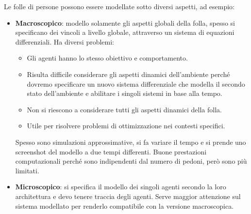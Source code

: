 Le folle di persone possono essere modellate sotto diversi aspetti, ad esempio:
\begin{itemize}
      \item \textbf{Macroscopico}: modello solamente gli aspetti globali della
            folla, spesso si specificano dei vincoli a livello globale, attraverso
            un sistema di equazioni differenziali. Ha diversi problemi:
            \begin{itemize}
                  \item Gli agenti hanno lo stesso obiettivo e comportamento.
                  \item Risulta difficile considerare gli aspetti dinamici
                        dell'ambiente perché dovremo specificare un nuovo sistema
                        differenziale che modella il secondo stato dell'ambiente
                        e abilitare i singoli sistemi in base alla tempo.
                  \item Non si riescono a considerare tutti gli aspetti dinamici
                        della folla.
                  \item Utile per risolvere problemi di ottimizzazione nei contesti
                        specifici.
            \end{itemize}
            Spesso sono simulazioni approssimative, si fa variare il tempo e si
            prende uno screenshot del modello a due tempi differenti. Buone
            prestazioni computazionali perché sono indipendenti dal numero
            di pedoni, però sono più limitati.
      \item \textbf{Microscopico}: si specifica il modello dei singoli agenti
            secondo la loro architettura e devo tenere traccia degli agenti.
            Serve maggior attenzione sul sistema modellato per renderlo
            compatibile con la versione macroscopica.


\end{itemize}
